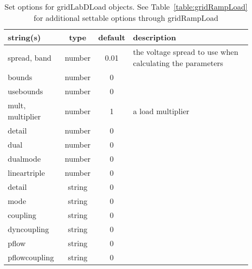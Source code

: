 \begin{table}[ht]
\centering
\begin{tabular}{p{5cm} c c p{7cm}}
\hline
string(s) & type & default & description \\
\hline
spread, band & number & 0.01 & the voltage spread to use when calculating the parameters\\
bounds & number & 0 & \\
usebounds & number & 0 & \\
mult, multiplier & number & 1 & a load multiplier\\
detail & number & 0 & \\
dual & number & 0 & \\
dualmode & number & 0 & \\
lineartriple & number & 0 & \\
detail & string & 0 & \\
mode & string & 0 & \\
coupling & string & 0 & \\
dyncoupling & string & 0 & \\
pflow & string & 0 & \\
pflowcoupling & string & 0 & \\
\hline
\end{tabular}
\caption{Set options for gridLabDLoad objects. See Table~\ref{table:gridRampLoad} for additional settable options through gridRampLoad}
\label{table:gridLabDLoad}
\end{table}

